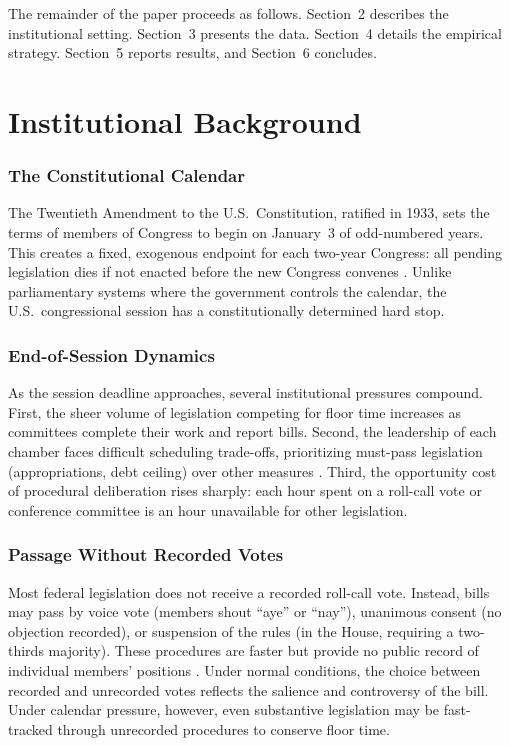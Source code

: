 \documentclass[12pt]{article}
\begin{document}
The remainder of the paper proceeds as follows. Section~2 describes the institutional setting. Section~3 presents the data. Section~4 details the empirical strategy. Section~5 reports results, and Section~6 concludes.


\section{Institutional Background}

\subsubsection*{The Constitutional Calendar} The Twentieth Amendment to the U.S.\ Constitution, ratified in 1933, sets the terms of members of Congress to begin on January~3 of odd-numbered years. This creates a fixed, exogenous endpoint for each two-year Congress: all pending legislation dies if not enacted before the new Congress convenes \citep{Oleszek2014}. Unlike parliamentary systems where the government controls the calendar, the U.S.\ congressional session has a constitutionally determined hard stop.

\subsubsection*{End-of-Session Dynamics} As the session deadline approaches, several institutional pressures compound. First, the sheer volume of legislation competing for floor time increases as committees complete their work and report bills. Second, the leadership of each chamber faces difficult scheduling trade-offs, prioritizing must-pass legislation (appropriations, debt ceiling) over other measures \citep{Cox2005}. Third, the opportunity cost of procedural deliberation rises sharply: each hour spent on a roll-call vote or conference committee is an hour unavailable for other legislation.

\subsubsection*{Passage Without Recorded Votes} Most federal legislation does not receive a recorded roll-call vote. Instead, bills may pass by voice vote (members shout ``aye'' or ``nay''), unanimous consent (no objection recorded), or suspension of the rules (in the House, requiring a two-thirds majority). These procedures are faster but provide no public record of individual members' positions \citep{Roberts2007}. Under normal conditions, the choice between recorded and unrecorded votes reflects the salience and controversy of the bill. Under calendar pressure, however, even substantive legislation may be fast-tracked through unrecorded procedures to conserve floor time.
\end{document}
